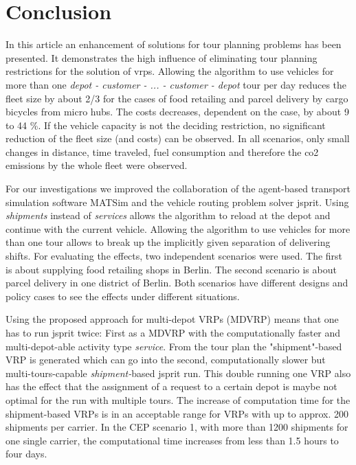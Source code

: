 \section{Conclusion}
\label{sec:el-shipments-conclusion}
In this article an enhancement of solutions for tour planning problems has been presented. It demonstrates the high influence of eliminating tour planning restrictions for the solution of \glspl{vrp}. 
Allowing the algorithm to use vehicles for more than one \textit{depot - customer - ... - customer - depot} tour per day reduces the fleet size by about 2/3 for the cases of food retailing and parcel delivery by cargo bicycles from micro hubs. The costs decreases, dependent on the case, by about 9 to 44 \%. 
If the vehicle capacity is not the deciding restriction, no significant reduction of the fleet size (and costs) can be observed.
In all scenarios, only small changes in distance, time traveled, fuel consumption and therefore the \gls{co2}  emissions by the whole fleet were observed.

For our investigations we improved the collaboration of the agent-based transport simulation software MATSim and the vehicle routing problem solver jsprit. Using \textit{shipments} instead of \textit{services} allows the algorithm to reload at the depot and continue with the current vehicle. Allowing the algorithm to use vehicles for more than one tour allows to break up the implicitly given separation of delivering shifts. For evaluating the effects, two independent scenarios were used. The first is about supplying food retailing shops in Berlin. The second scenario is about parcel delivery in one district of Berlin. Both scenarios have different designs and policy cases to see the effects under different situations. 

Using the proposed approach for multi-depot VRPs (MDVRP) means that one has to run jsprit twice: First as a {MDVRP} with the computationally faster and multi-depot-able activity type \textit{service}. From the tour plan the "shipment"-based VRP is generated which can go into the second, computationally slower but multi-tours-capable \textit{shipment-}based jsprit run. This double running one VRP also has the effect that the assignment of a request to a certain depot is maybe not optimal for the run with multiple tours. The increase of computation time for the shipment-based VRPs is in an acceptable range for VRPs with up to approx. 200 shipments per carrier. In the CEP scenario 1, with more than 1200 shipments for one single carrier, the computational time increases from less than 1.5 hours to four days.

